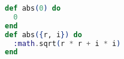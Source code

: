 \begin{lstlisting}[language=Elixir]
def abs(0) do
  0
end
def abs({r, i}) do
  :math.sqrt(r * r + i * i)
end
\end{lstlisting}